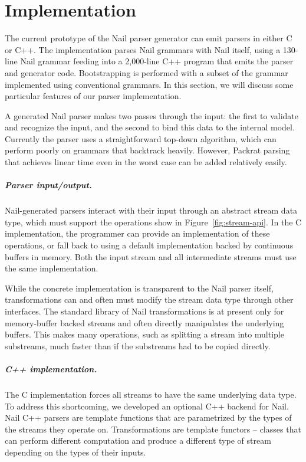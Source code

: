 \chapter{Implementation}
\label{s:impl}

The current prototype of the Nail parser generator can emit parsers in either C or C++. The implementation parses Nail grammars with Nail itself, using a
130-line Nail grammar feeding into a 2,000-line C++ program that
emits the parser and generator code. Bootstrapping is
performed with a subset of the grammar implemented using conventional grammars. 
In this section, we will discuss some particular features of our parser
implementation.


A generated Nail parser makes two passes through the input: the first to
validate and recognize the input, and the second to bind this data to the internal
model. Currently the parser uses a straightforward top-down algorithm, which can perform poorly on
grammars that backtrack heavily. However, Packrat
parsing~\cite{packrat-parsing:icfp02} that achieves linear time even in the worst case can be added relatively easily.

\paragraph{Parser input/output.}
Nail-generated parsers interact with their input through an abstract stream data type, which must support the operations show in Figure~\ref{fig:stream-api}. In the C implementation, the programmer can provide an implementation of these operations, or fall back to using a default implementation backed by continuous buffers in memory. Both the input stream and all intermediate streams must use the same implementation.

While the concrete implementation is transparent to the Nail parser itself, transformations can and often must modify the stream data type through other interfaces. The standard library of Nail transformations is at present only for memory-buffer backed streams and often directly manipulates the underlying buffers. This makes many operations, such as splitting a stream into multiple substreams, much faster than if the substreams had to be copied directly. 


\paragraph{C++ implementation.}
The C implementation forces all streams to have the same underlying data type. To address this shortcoming, we developed an optional C++ backend for Nail. Nail C++ parsers are template functions that are parametrized by the types of the streams they operate on. Transformations are template functors -- classes that can perform different computation  and produce a different type of stream depending on the types of their inputs.

